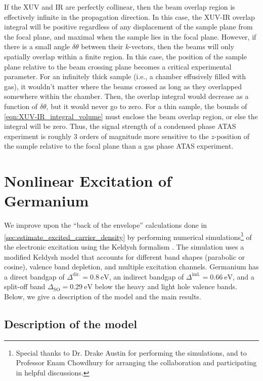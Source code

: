 If the XUV and IR are perfectly collinear, then the beam overlap region is effectively infinite in the propagation direction. In this case, the XUV-IR overlap integral will be positive regardless of any displacement of the sample plane from the focal plane, and maximal when the sample lies in the focal plane. However, if there is a small angle $\delta \theta$ between their $k$-vectors, then the beams will only spatially overlap within a finite region. In this case, the position of the sample plane relative to the beam crossing plane becomes a critical experimental parameter. For an infinitely thick sample (i.e., a chamber effusively filled with gas), it wouldn't matter where the beams crossed as long as they overlapped somewhere within the chamber. Then, the overlap integral would decrease as a function of $\delta \theta$, but it would never go to zero. For a thin sample, the bounds of \cref{eqn:XUV-IR_integral_volume} must enclose the beam overlap region, or else the integral will be zero. Thus, the signal strength of a condensed phase ATAS experiment is roughly 3 orders of magnitude more sensitive to the $z$-position of the sample relative to the focal plane than a gas phase ATAS experiment.


\section{Nonlinear Excitation of Germanium}
\label{sec:nonlinear_excitation_germanium}


We improve upon the ``back of the envelope'' calculations done in \cref{sec:estimate_excited_carrier_density} by performing numerical simulations\footnote{Special thanks to Dr. Drake Austin for performing the simulations, and to Professor Enam Chowdhury for arranging the collaboration and participating in helpful discussions.} of the electronic excitation using the Keldysh formalism \cite{sergaevaUltrafastExcitationConductionband2018,keldyshIonizationFieldStrong1965,vpopruzhenkoKeldyshTheoryStrong2014}. The simulation uses a modified Keldysh model that accounts for different band shapes (parabolic or cosine), valence band depletion, and multiple excitation channels. Germanium has a direct bandgap of $\Delta^{\textrm{dir.}} = 0.8 \ \textrm{eV}$, an indirect bandgap of $\Delta^{\textrm{ind.}} = 0.66 \ \textrm{eV}$, and a split-off band $\Delta_{\textrm{SO}} = 0.29 \ \textrm{eV}$ below the heavy and light hole valence bands. Below, we give a description of the model and the main results.

\subsection{Description of the model}
\label{sec:nonlinear_excitation_model_details}

